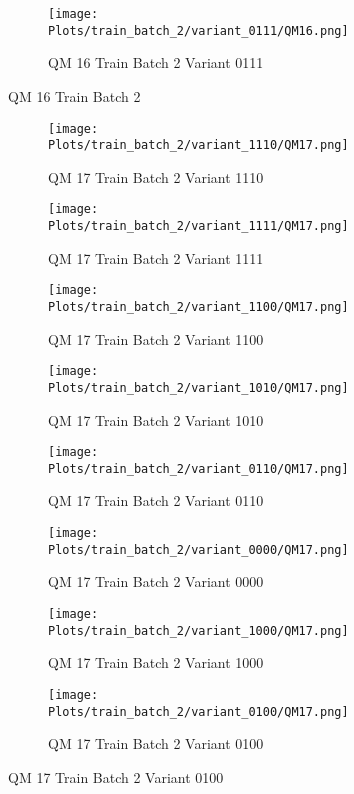 \documentclass{DissertateFigs}
\begin{document}
\begin{figure}[t!]
\medskip

    \begin{subfigure}{0.33\textwidth}
    \texttt{[image: Plots/train\_batch\_2/variant\_0111/QM16.png]}
    \caption{QM 16 Train Batch 2 Variant 0111}
    \end{subfigure}
\caption{QM 16 Train Batch 2}
    \end{figure}
\clearpage
\begin{figure}[t!]
    \begin{subfigure}{0.43\textwidth}
    \texttt{[image: Plots/train\_batch\_2/variant\_1110/QM17.png]}
    \caption{QM 17 Train Batch 2 Variant 1110}
    \end{subfigure}
    \begin{subfigure}{0.43\textwidth}
    \texttt{[image: Plots/train\_batch\_2/variant\_1111/QM17.png]}
    \caption{QM 17 Train Batch 2 Variant 1111}
    \end{subfigure}

\medskip

    \begin{subfigure}{0.43\textwidth}
    \texttt{[image: Plots/train\_batch\_2/variant\_1100/QM17.png]}
    \caption{QM 17 Train Batch 2 Variant 1100}
    \end{subfigure}
    \begin{subfigure}{0.43\textwidth}
    \texttt{[image: Plots/train\_batch\_2/variant\_1010/QM17.png]}
    \caption{QM 17 Train Batch 2 Variant 1010}
    \end{subfigure}

\medskip

    \begin{subfigure}{0.43\textwidth}
    \texttt{[image: Plots/train\_batch\_2/variant\_0110/QM17.png]}
    \caption{QM 17 Train Batch 2 Variant 0110}
    \end{subfigure}
    \begin{subfigure}{0.43\textwidth}
    \texttt{[image: Plots/train\_batch\_2/variant\_0000/QM17.png]}
    \caption{QM 17 Train Batch 2 Variant 0000}
    \end{subfigure}

\medskip

    \begin{subfigure}{0.43\textwidth}
    \texttt{[image: Plots/train\_batch\_2/variant\_1000/QM17.png]}
    \caption{QM 17 Train Batch 2 Variant 1000}
    \end{subfigure}
    \begin{subfigure}{0.43\textwidth}
    \texttt{[image: Plots/train\_batch\_2/variant\_0100/QM17.png]}
    \caption{QM 17 Train Batch 2 Variant 0100}
    \end{subfigure}


\end{figure}
\end{document}
